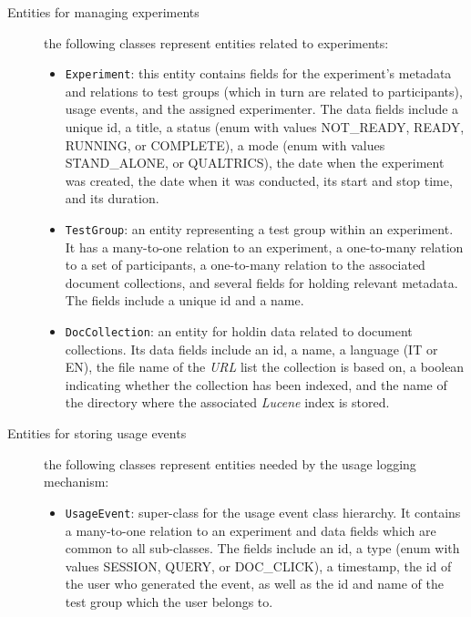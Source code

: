 \documentclass[a4paper]{usiinfbachelorproject}
\begin{document}
\begin{description}
        \item[Entities for managing experiments] the following classes represent entities related to experiments:

            \begin{itemize}

                \item \texttt{Experiment}: this entity contains fields for the experiment's metadata and relations to test groups 
                    (which in turn are related to participants), usage events, and the assigned experimenter. The data fields include a unique id, 
                    a title, a status (enum with values NOT\_READY, READY, RUNNING, or COMPLETE), a mode
                    (enum with values STAND\_ALONE, or QUALTRICS), the date when the experiment was created, the date when it was conducted,
                    its start and stop time, and its duration.

                \item \texttt{TestGroup}: an entity representing a test group within an experiment. It has a many-to-one relation
                    to an experiment, a one-to-many relation to a set of participants, a one-to-many relation to 
                    the associated document collections, and several fields for holding relevant metadata.
                    The fields include a unique id and a name. 
                     
                \item \texttt{DocCollection}: an entity for holdin data related to document collections. Its data fields
                    include an id, a name, a language (IT or EN), the file name of the \emph{URL} list the collection is based on,
                    a boolean indicating whether the collection has been indexed, and the name of the directory where the
                    associated \emph{Lucene} index is stored.

            \end{itemize}

        \item[Entities for storing usage events] the following classes represent entities needed by the usage logging mechanism: 

            \begin{itemize}

                \item \texttt{UsageEvent}: super-class for the usage event class hierarchy. It contains a many-to-one relation
                    to an experiment and data fields which are common to all sub-classes. The fields include an id,
                    a type (enum with values SESSION, QUERY, or DOC\_CLICK), a timestamp, the id of the user who generated the event, 
                    as well as the id and name of the test group which the user belongs to.


\end{itemize}
\end{description}
\end{document}
